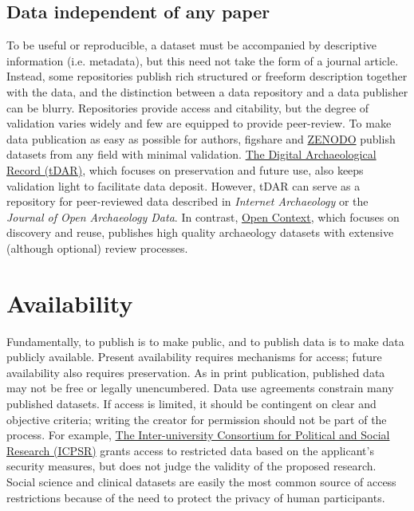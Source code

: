 \documentclass[10pt,twocolumn]{article}
\begin{document}
\subsection*{Data independent of any paper}\label{paper-independent-data}

To be useful or reproducible, a dataset must be accompanied by descriptive information (i.e. metadata)\cite{gray_online_2002}, but this need not take the form of a journal article.
Instead, some repositories publish rich structured or freeform description together with the data, and the distinction between a data repository and a data publisher can be blurry.
Repositories provide access and citability, but the degree of validation varies widely and few are equipped to provide peer-review.
To make data publication as easy as possible for authors, figshare and \href{https://zenodo.org/}{ZENODO} publish datasets from any field with minimal validation.
\href{http://www.tdar.org/}{The Digital Archaeological Record (tDAR)}, which focuses on preservation and future use, also keeps validation light to facilitate data deposit.
However, tDAR can serve as a repository for peer-reviewed data described in \emph{Internet Archaeology} or the \emph{Journal of Open Archaeology Data}.
In contrast, \href{http://opencontext.org/}{Open Context}, which focuses on discovery and reuse, publishes high quality archaeology datasets with extensive (although optional) review processes.


\section*{Availability}\label{availability}

Fundamentally, to publish is to make public, and to publish data is to make data publicly available.
Present availability requires mechanisms for access; future availability also requires preservation.\cite{beagrie_digital_2008, gray_online_2002}
As in print publication, published data may not be free or legally unencumbered.
Data use agreements constrain many published datasets.
If access is limited, it should be contingent on clear and objective criteria; writing the creator for permission should not be part of the process.
For example, \href{http://www.icpsr.umich.edu/icpsrweb/content/deposit/confidentiality.html}{The Inter-university Consortium for Political and Social Research (ICPSR)} grants access to restricted data based on the applicant's security measures, but does not judge the validity of the proposed research.
Social science and clinical datasets are easily the most common source of access restrictions because of the need to protect the privacy of human participants.
\end{document}
